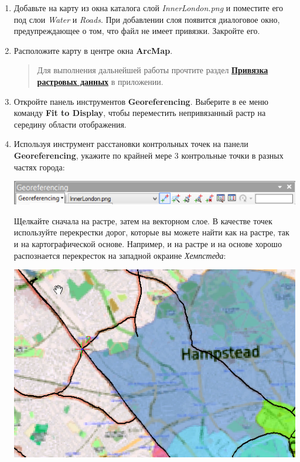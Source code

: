 \documentclass[]{book}
\theoremstyle{definition}
\theoremstyle{definition}
\theoremstyle{definition}
\theoremstyle{remark}
\begin{document}
\begin{enumerate}
\def\labelenumi{\arabic{enumi}.}
\item
  Добавьте на карту из окна каталога слой \emph{InnerLondon.png} и
  поместите его под слои \emph{Water} и \emph{Roads}. При добавлении
  слоя появится диалоговое окно, предупреждающее о том, что файл не
  имеет привязки. Закройте его.
\item
  Расположите карту в центре окна \textbf{ArcMap}.

  \begin{quote}
  Для выполнения дальнейшей работы прочтите раздел
  \textbf{\protect\hyperlink{manual-georef}{Привязка растровых данных}}
  в приложении.
  \end{quote}
\item
  Откройте панель инструментов \textbf{Georeferencing}. Выберите в ее
  меню команду \textbf{Fit to Display}, чтобы переместить непривязанный
  растр на середину области отображения.
\item
  Используя инструмент расстановки контрольных точек на панели
  \textbf{Georeferencing}, укажите по крайней мере 3 контрольные точки в
  разных частях города:

  \includegraphics{images/Ex07/image8.png}

  Щелкайте сначала на растре, затем на векторном слое. В качестве точек
  используйте перекрестки дорог, которые вы можете найти как на растре,
  так и на картографической основе. Например, и на растре и на основе
  хорошо распознается перекресток на западной окраине \emph{Хемпстеда}:

  \includegraphics{images/Ex07/image9.png}


\end{enumerate}
\end{document}
